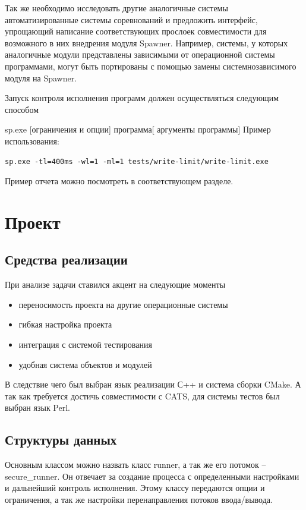 \documentclass{imcs}
\begin{document}
Так же необходимо исследовать другие аналогичные системы автоматизированные системы соревнований и предложить интерфейс, упрощающий написание соответствующих прослоек совместимости для возможного в них внедрения модуля Spawner. Например, системы, у которых аналогичные модули представлены зависимыми от операционной системы программами, могут быть портированы с помощью замены системнозависимого модуля на Spawner.

Запуск контроля исполнения программ должен осуществляться следующим способом

sp.exe [ограничения и опции] программа[ аргументы программы]
Пример использования:

\begin{lstlisting}
sp.exe -tl=400ms -wl=1 -ml=1 tests/write-limit/write-limit.exe
\end{lstlisting}

Пример отчета можно посмотреть в соответствующем разделе.

\section{Проект}

\subsection{Средства реализации}

При анализе задачи ставился акцент на следующие моменты
\begin{itemize}
	\item	переносимость проекта на другие операционные системы
	\item	гибкая настройка проекта
	\item	интеграция с системой тестирования
	\item	удобная система объектов и модулей
\end{itemize}
В следствие чего был выбран язык реализации С++ и система сборки CMake. 
А так как требуется достичь совместимости с CATS, для системы тестов был выбран язык Perl.


\subsection{Структуры данных}

Основным классом можно назвать класс runner, а так же его потомок – secure\_runner.
Он отвечает за создание процесса с определенными настройками и дальнейший контроль исполнения. Этому классу передаются опции и ограничения, а так же настройки перенаправления потоков ввода/вывода.
\end{document}
